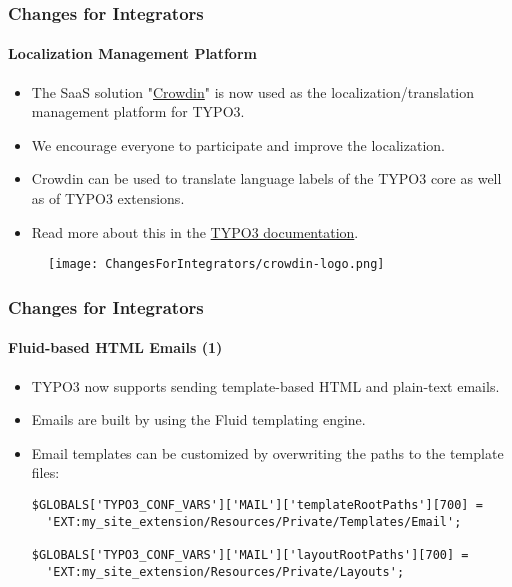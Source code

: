 
\begin{frame}[fragile]
	\frametitle{Changes for Integrators}
	\framesubtitle{Localization Management Platform}

	\begin{itemize}
		\item The SaaS solution "\href{https://crowdin.com/}{Crowdin}" is now used as
			the localization/translation management platform for TYPO3.
		\item We encourage everyone to participate and improve the localization.
		\item Crowdin can be used to translate language labels of the TYPO3 core
			as well as of TYPO3 extensions.
		\item Read more about this in the
			\href{https://docs.typo3.org/m/typo3/reference-coreapi/master/en-us/ApiOverview/Internationalization/TranslationServer/Crowdin.html}{TYPO3 documentation}.
	\end{itemize}

	\begin{figure}
		\texttt{[image: ChangesForIntegrators/crowdin-logo.png]}
	\end{figure}

\end{frame}


\begin{frame}[fragile]
	\frametitle{Changes for Integrators}
	\framesubtitle{Fluid-based HTML Emails (1)}

	\lstset{basicstyle=\smaller\ttfamily}

	\begin{itemize}
		\item TYPO3 now supports sending template-based HTML and plain-text emails.
		\item Emails are built by using the Fluid templating engine.
		\item Email templates can be customized by overwriting the paths to the template files:

\vspace{-0.4cm}
\begin{lstlisting}
$GLOBALS['TYPO3_CONF_VARS']['MAIL']['templateRootPaths'][700] =
  'EXT:my_site_extension/Resources/Private/Templates/Email';

$GLOBALS['TYPO3_CONF_VARS']['MAIL']['layoutRootPaths'][700] =
  'EXT:my_site_extension/Resources/Private/Layouts';
\end{lstlisting}

	\end{itemize}

\end{frame}

